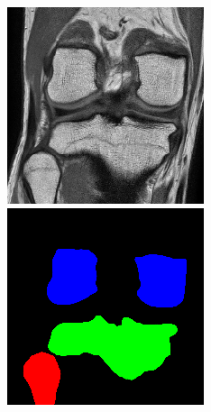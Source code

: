\begin{figure}[H]
\endminipage
\vspace{0.15cm}
  \includegraphics[width=\linewidth]{imgs/a2.png}
\endminipage\hfill
{}
  \includegraphics[width=\linewidth]{imgs/b2.png}

\end{figure}

